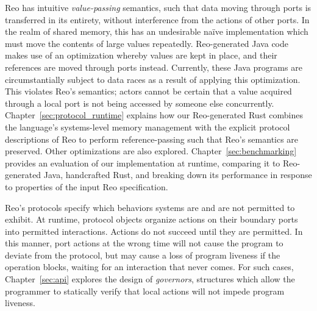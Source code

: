 Reo has intuitive \textit{value-passing} semantics, such that data moving through ports is transferred in its entirety, without interference from the actions of other ports. In the realm of shared memory, this has an undesirable na\"ive implementation which must move the contents of large values repeatedly. Reo-generated Java code makes use of an optimization whereby values are kept in place, and their references are moved through ports instead. Currently, these Java programs are circumstantially subject to data races as a result of applying this optimization. This violates Reo's semantics; actors cannot be certain that a value acquired through a local port is not being accessed by someone else concurrently. Chapter~\ref{sec:protocol_runtime} explains how our Reo-generated Rust combines the language's systems-level memory management with the explicit protocol descriptions of Reo to perform reference-passing such that Reo's semantics are preserved. Other 
optimizations are also explored. Chapter~\ref{sec:benchmarking} provides an evaluation of our implementation at runtime, comparing it to Reo-generated Java, handcrafted Rust, and breaking down its performance in response to properties of the input Reo specification.

Reo's protocols specify which behaviors systems are and are not permitted to exhibit. At runtime, protocol objects organize actions on their boundary ports into permitted interactions. Actions do not succeed until they are permitted. In this manner, port actions at the wrong time will not cause the program to deviate from the protocol, but may cause a loss of program liveness if the operation blocks, waiting for an interaction that never comes. For such cases, Chapter~\ref{sec:api} explores the design of \textit{governors}, structures which allow the programmer to statically verify that local actions will not impede program liveness.
